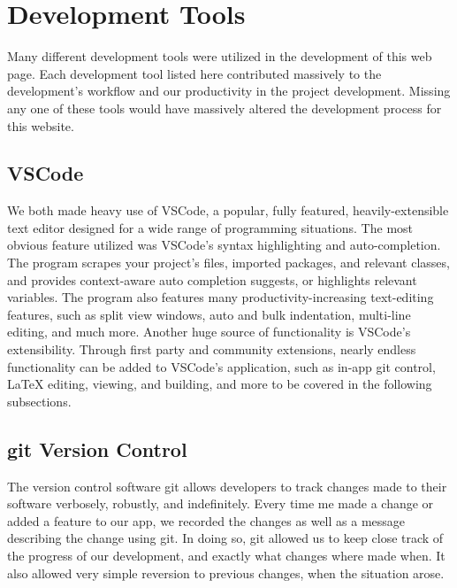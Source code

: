 \documentclass[sigconf]{acmart}
\begin{document}

\maketitle

\pagebreak
\section{Development Tools}
Many different development tools were utilized in the development of this web page. Each development tool listed here contributed massively to the development's workflow and our productivity in the project development. Missing any one of these tools would have massively altered the development process for this website.

\subsection{VSCode}
We both made heavy use of VSCode, a popular, fully featured, heavily-extensible text editor designed for a wide range of programming situations. The most obvious feature utilized was VSCode's syntax highlighting and auto-completion. The program scrapes your project's files, imported packages, and relevant classes, and provides context-aware auto completion suggests, or highlights relevant variables. The program also features many productivity-increasing text-editing features, such as split view windows, auto and bulk indentation, multi-line editing, and much more. Another huge source of functionality is VSCode's extensibility. Through first party and community extensions, nearly endless functionality can be added to VSCode's application, such as in-app git control, LaTeX editing, viewing, and building, and more to be covered in the following subsections.

\subsection{git Version Control}
The version control software git allows developers to track changes made to their software verbosely, robustly, and indefinitely. Every time me made a change or added a feature to our app, we recorded the changes as well as a message describing the change using git. In doing so, git allowed us to keep close track of the progress of our development, and exactly what changes where made when. It also allowed very simple reversion to previous changes, when the situation arose.
\end{document}
